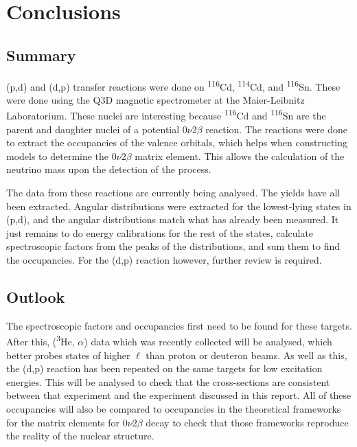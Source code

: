 
\chapter{Conclusions} %

\label{Chapter6} %



\section{Summary}
(p,d) and (d,p) transfer reactions were done on \textsuperscript{116}Cd, \textsuperscript{114}Cd, and \textsuperscript{116}Sn. These were done using the Q3D magnetic spectrometer at the Maier-Leibnitz Laboratorium. These nuclei are interesting because \textsuperscript{116}Cd and \textsuperscript{116}Sn are the parent and daughter nuclei of a potential $0\nu2\beta$ reaction. The reactions were done to extract the occupancies of the valence orbitals, which helps when constructing models to determine the $0\nu2\beta$ matrix element. This allows the calculation of the neutrino mass upon the detection of the process.

The data from these reactions are currently being analysed. The yields have all been extracted. Angular distributions were extracted for the lowest-lying states in (p,d), and the angular distributions match what has already been measured. It just remains to do energy calibrations for the rest of the states, calculate spectroscopic factors from the peaks of the distributions, and sum them to find the occupancies. For the (d,p) reaction however, further review is required.
\newpage
\section{Outlook}

The spectroscopic factors and occupancies first need to be found for these targets. After this, (\textsuperscript{3}He, $\alpha$) data which was recently collected will be analysed, which better probes states of higher $\ell$ than proton or deuteron beams. As well as this, the (d,p) reaction has been repeated on the same targets for low excitation energies. This will be analysed to check that the cross-sections are consistent between that experiment and the experiment discussed in this report. All of these occupancies will also be compared to occupancies in the theoretical frameworks for the matrix elements for $0\nu2\beta$ decay to check that those frameworks reproduce the reality of the nuclear structure.

